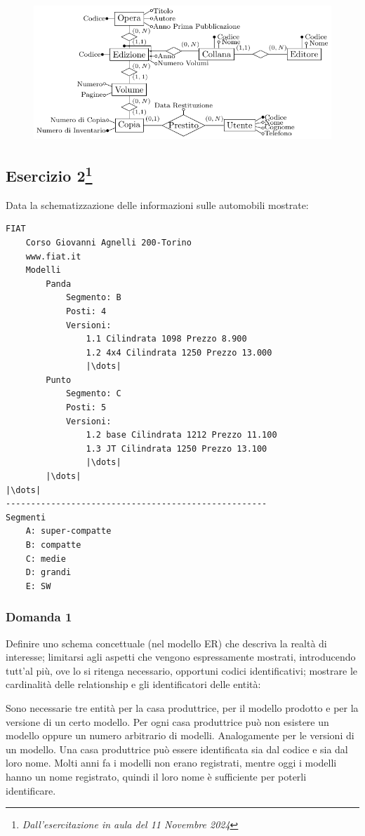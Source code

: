 \documentclass{article}
\begin{document}
\begin{figure}[H]%
    \centering%
    \includegraphics[scale=1.25]{schema_er_es_1.pdf}%
\end{figure}

\subsection{Esercizio 2\footnote{\textit{Dall'esercitazione in aula del 11 Novembre 2024}}}

Data la schematizzazione delle informazioni sulle automobili mostrate:
\begin{verbatim}
FIAT
    Corso Giovanni Agnelli 200-Torino
    www.fiat.it
    Modelli
        Panda
            Segmento: B
            Posti: 4
            Versioni:
                1.1 Cilindrata 1098 Prezzo 8.900
                1.2 4x4 Cilindrata 1250 Prezzo 13.000
                |\dots|        
        Punto
            Segmento: C
            Posti: 5
            Versioni:
                1.2 base Cilindrata 1212 Prezzo 11.100
                1.3 JT Cilindrata 1250 Prezzo 13.100
                |\dots|
        |\dots|
|\dots|
----------------------------------------------------
Segmenti
    A: super-compatte
    B: compatte
    C: medie
    D: grandi
    E: SW
\end{verbatim}

\subsubsection*{Domanda 1}


Definire uno schema concettuale (nel modello ER) che descriva la realtà di interesse; limitarsi agli aspetti che vengono espressamente mostrati, introducendo tutt'al più, 
ove lo si ritenga necessario, opportuni codici identificativi; mostrare le cardinalità delle relationship e gli identificatori delle entità:


Sono necessarie tre entità per la casa produttrice, per il modello prodotto e per la versione di un certo modello. Per ogni casa produttrice può non esistere un 
modello oppure un numero arbitrario di modelli. Analogamente per le versioni di un modello. Una casa produttrice può essere identificata sia dal 
codice e sia dal loro nome. Molti anni fa i modelli non erano registrati, mentre oggi i modelli hanno un nome registrato, quindi il loro nome è sufficiente per 
poterli identificare. 
\end{document}
